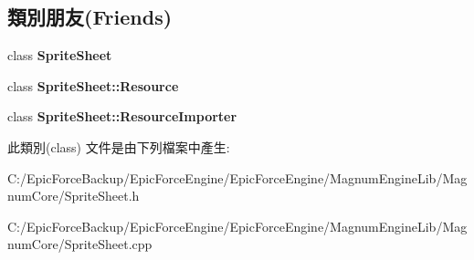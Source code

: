 \subsection*{類別朋友(Friends)}
\begin{DoxyCompactItemize}
\item 
class {\bfseries Sprite\+Sheet}\hypertarget{class_magnum_1_1_sprite_sheet_1_1_sequence_ab43118917ba092ba6289c7ee4cd3e5fd}{}\label{class_magnum_1_1_sprite_sheet_1_1_sequence_ab43118917ba092ba6289c7ee4cd3e5fd}

\item 
class {\bfseries Sprite\+Sheet\+::\+Resource}\hypertarget{class_magnum_1_1_sprite_sheet_1_1_sequence_a8727041c910f9527ea7b20dfac74f485}{}\label{class_magnum_1_1_sprite_sheet_1_1_sequence_a8727041c910f9527ea7b20dfac74f485}

\item 
class {\bfseries Sprite\+Sheet\+::\+Resource\+Importer}\hypertarget{class_magnum_1_1_sprite_sheet_1_1_sequence_a3c6baee866d2819736b4c0a94c9e507c}{}\label{class_magnum_1_1_sprite_sheet_1_1_sequence_a3c6baee866d2819736b4c0a94c9e507c}

\end{DoxyCompactItemize}


此類別(class) 文件是由下列檔案中產生\+:\begin{DoxyCompactItemize}
\item 
C\+:/\+Epic\+Force\+Backup/\+Epic\+Force\+Engine/\+Epic\+Force\+Engine/\+Magnum\+Engine\+Lib/\+Magnum\+Core/Sprite\+Sheet.\+h\item 
C\+:/\+Epic\+Force\+Backup/\+Epic\+Force\+Engine/\+Epic\+Force\+Engine/\+Magnum\+Engine\+Lib/\+Magnum\+Core/Sprite\+Sheet.\+cpp\end{DoxyCompactItemize}
